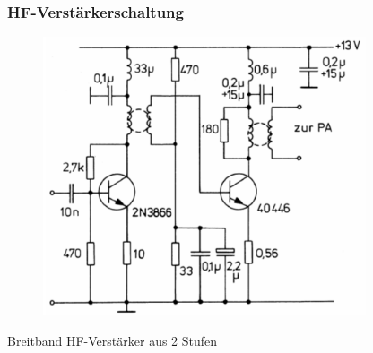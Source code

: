 \begin{frame}
  \frametitle{HF-Verstärkerschaltung}
  \begin{center}
    \begin{figure}
      \includegraphics[width=0.85\textwidth,height=.65\textheight,keepaspectratio]{a07/TG237.png}
    \end{figure}
  \end{center}
  Breitband HF-Verstärker aus 2 Stufen
\end{frame}

